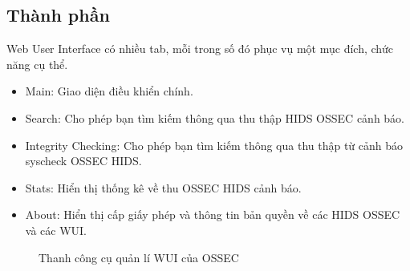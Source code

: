  \subsection{Thành phần}
Web User Interface có nhiều tab, mỗi trong số đó phục vụ một mục đích, chức năng
cụ thể.
\begin{itemize}
  \item Main: Giao diện điều khiển chính.
  \item Search: Cho phép bạn tìm kiếm thông qua thu thập HIDS OSSEC cảnh báo.
  \item Integrity Checking:  Cho phép bạn tìm kiếm thông qua thu thập từ cảnh
  báo syscheck OSSEC HIDS.
  \item Stats: Hiển thị thống kê về thu OSSEC HIDS cảnh báo.
  \item About:  Hiển thị cấp giấy phép và thông tin bản quyền về các HIDS OSSEC
  và các WUI.
\end{itemize}
\begin{figure}[h!]
	\centering 
	\caption{Thanh công cụ quản lí WUI của OSSEC}
  \end{figure}
